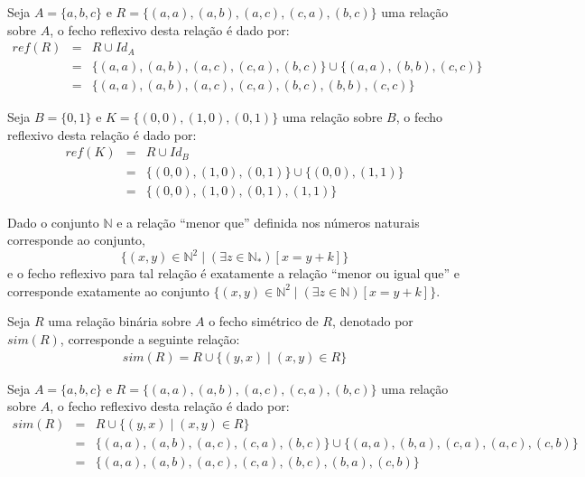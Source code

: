 \begin{exemplo}
	Seja $A = \{a, b, c\}$ e $R = \{(a, a), (a, b), (a, c), (c, a), (b, c)\}$ uma relação sobre $A$,  o fecho reflexivo desta relação é dado por:
	\begin{eqnarray*}
		ref(R)  & = & R \cup Id_A\\
		& = & \{(a, a), (a, b), (a, c), (c, a), (b, c)\} \cup \{(a,a), (b, b), (c,c)\}\\
		& = & \{(a, a), (a, b), (a, c), (c, a), (b, c), (b, b), (c,c)\}
	\end{eqnarray*}
\end{exemplo}

\begin{exemplo}
	Seja $B = \{0, 1\}$ e $K= \{(0, 0), (1, 0), (0, 1)\}$ uma relação sobre $B$,  o fecho reflexivo desta relação é dado por:
	\begin{eqnarray*}
		ref(K)  & = & R \cup Id_B\\
		& = & \{(0, 0), (1, 0), (0, 1)\} \cup \{(0,0), (1, 1)\}\\
		& = & \{(0, 0), (1, 0), (0, 1), (1, 1)\} 
	\end{eqnarray*}
\end{exemplo}

\begin{exemplo}
	Dado o conjunto $\mathbb{N}$ e a relação ``menor que'' definida nos números naturais corresponde ao conjunto, 
	$$\{(x, y) \in \mathbb{N}^2 \mid (\exists z \in \mathbb{N}_*)[x = y + k]\}$$ 
	e o fecho reflexivo para tal relação é exatamente a relação ``menor ou igual que'' e corresponde exatamente ao conjunto $\{(x, y) \in \mathbb{N}^2 \mid (\exists z \in \mathbb{N})[x = y + k]\}$.
\end{exemplo}

\begin{definicao}\label{def:FechoSimetrico}
	Seja $R$ uma relação binária sobre $A$ o fecho simétrico de $R$, denotado por $sim(R)$, corresponde a seguinte relação:
	\begin{eqnarray*}
		sim(R) = R \cup \{(y, x) \mid (x, y) \in R\}
	\end{eqnarray*}
\end{definicao}

\begin{exemplo}
	Seja $A = \{a, b, c\}$ e $R = \{(a, a), (a, b), (a, c), (c, a), (b, c)\}$ uma relação sobre $A$,  o fecho reflexivo desta relação é dado por:
	\begin{eqnarray*}
		sim(R) & = &   R \cup \{(y, x) \mid (x, y) \in R\}\\
		& = &  \{(a, a), (a, b), (a, c), (c, a), (b, c)\} \cup \{(a, a), (b, a), (c, a), (a, c), (c, b)\}\\
		& = & \{(a, a), (a, b), (a, c), (c, a), (b, c), (b, a), (c, b)\}
	\end{eqnarray*}
\end{exemplo}

